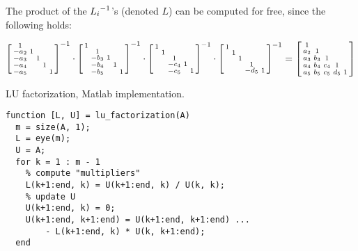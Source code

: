 \documentclass[computationalMathematics.tex]{subfiles}
\begin{document}
\begin{obs}\label{obs:21novstroke1}
  The product of the ${L_i}^{-1}$'s (denoted $L$) can be computed for free, since the following holds:

\begin{gather*}
\begin{bsmallmatrix}
    1 & \\
    -a_2 & 1 & \\
    -a_3 &  & 1  \\
    -a_4 &  & & 1  \\
    -a_5 &  &  & & 1 
\end{bsmallmatrix}^{-1} \cdot
\begin{bsmallmatrix}
    1 & \\
     & 1 & \\
     & -b_3 & 1  \\
     & -b_4 & & 1  \\
     & -b_5 &  & & 1 
\end{bsmallmatrix}^{-1} \cdot
\begin{bsmallmatrix}
    1 & \\
     & 1 & \\
     &  & 1  \\
     &  & -c_4& 1  \\
     &  & -c_5 & & 1 
\end{bsmallmatrix}^{-1} \cdot 
\begin{bsmallmatrix}
    1 & \\
     & 1 & \\
     &  & 1  \\
     &  & & 1  \\
     &  &  & -d_5& 1 
\end{bsmallmatrix}^{-1}
= \begin{bsmallmatrix}
    1 & \\
    a_2 & 1 & \\
    a_3 & b_3 & 1  \\
    a_4 & b_4 & c_4& 1  \\
    a_5 & b_5 & c_5 &d_5 & 1     
\end{bsmallmatrix}
\end{gather*}
\end{obs}

\begin{center}
\begin{minipage}{.9\linewidth}
  \begin{algorithm}[H]
    \caption{LU factorization, Matlab implementation.}\label{algo:21nov1}
    \begin{verbatim}
function [L, U] = lu_factorization(A)
  m = size(A, 1);
  L = eye(m);
  U = A;
  for k = 1 : m - 1
    % compute "multipliers"
    L(k+1:end, k) = U(k+1:end, k) / U(k, k);
    % update U 
    U(k+1:end, k) = 0;
    U(k+1:end, k+1:end) = U(k+1:end, k+1:end) ... 
        - L(k+1:end, k) * U(k, k+1:end);
  end
    \end{verbatim}
  \end{algorithm}
\end{minipage}
\end{center}
\vspace{0.5cm}
\end{document}
